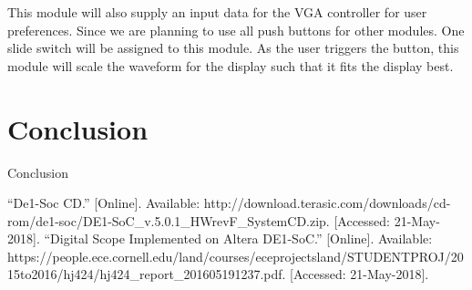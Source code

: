 \documentclass[paper]{IEEEtran}
\begin{document}
	This module will also supply an input data for the VGA controller for user preferences. Since we are planning to use all push buttons for other modules. One slide switch will be assigned to this module. As the user triggers the button, this module will scale the waveform for the display such that it fits the display best.

	
	
\section{Conclusion}
\- \indent
	Conclusion
	
	

\begin{thebibliography}{00}
 “De1-Soc CD.” [Online]. Available: http://download.terasic.com/downloads/cd-rom/de1-soc/DE1-SoC\_v.5.0.1\_HWrevF\_SystemCD.zip. [Accessed: 21-May-2018].
 “Digital Scope Implemented on Altera DE1-SoC.” [Online]. Available: https://people.ece.cornell.edu/land/courses/eceprojectsland/STUDENTPROJ/2015to2016/hj424/hj424\_report\_201605191237.pdf. [Accessed: 21-May-2018].

\end{thebibliography}
\end{document}
